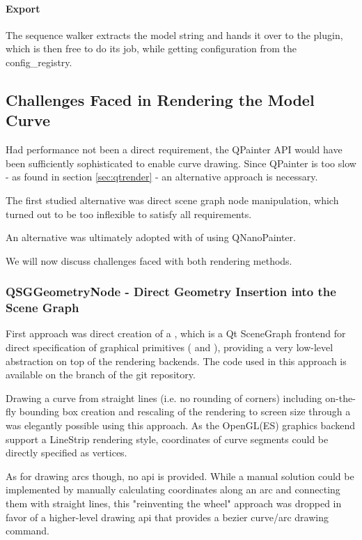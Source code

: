 \paragraph{Export} The sequence walker extracts the model string and hands it over to the plugin, which is then free to do its job, while getting configuration from the config\_registry.

\subsection{Challenges Faced in Rendering the Model Curve}
Had performance not been a direct requirement, the QPainter API would have been sufficiently sophisticated to enable curve drawing. Since QPainter is too slow - as found in section \ref{sec:qtrender} - an alternative approach is necessary.

The first studied alternative was direct scene graph node manipulation, which turned out to be too inflexible to satisfy all requirements.

An alternative was ultimately adopted with of using QNanoPainter.

We will now discuss challenges faced with both rendering methods.

\subsubsection{QSGGeometryNode - Direct Geometry Insertion into the Scene Graph}

First approach was direct creation of a , which is a Qt SceneGraph frontend for direct specification of graphical primitives ( and ), providing a very low-level abstraction on top of the rendering backends.
The code used in this approach is available on the  branch of the git repository.

Drawing a curve from straight lines (i.e. no rounding of corners) including on-the-fly \gls{bounding box} creation and rescaling of the rendering to screen size through a  was elegantly possible using this approach. As the OpenGL(ES) graphics backend support a LineStrip rendering style, coordinates of curve segments could be directly specified as vertices.

As for drawing arcs though, no \gls{api} is provided. While a manual solution could be implemented by manually calculating coordinates along an arc and connecting them with straight lines, this "reinventing the wheel" approach was dropped in favor of a higher-level drawing \gls{api} that provides a bezier curve/arc drawing command. 

